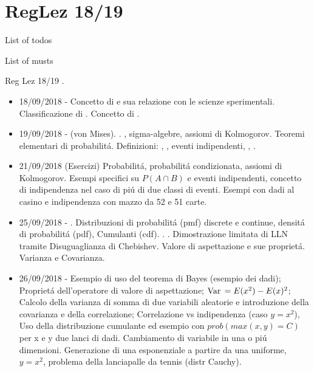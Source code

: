 \section{RegLez 18/19}

\begin{frame}[allowframebreaks]{List of todos}
\listoftodos
\end{frame}

\begin{frame}[allowframebreaks]{List of musts}
\listofmusts
\end{frame}


\begin{frame}[allowframebreaks]{Reg Lez 18/19}
\cite{reg18}.
\begin{itemize}
\item 18/09/2018 - Concetto di  e sua relazione con le scienze sperimentali. Classificazione di . Concetto di .
\item 19/09/2018 -  (von Mises). . , sigma-algebre, assiomi di Kolmogorov. Teoremi elementari di probabilit\'a. Definizioni: , , eventi indipendenti, , .
\item 21/09/2018 (Esercizi) Probabilit\'a, probabilit\'a condizionata, assiomi di Kolmogorov. Esempi specifici su $P(A \cap B)$ e eventi indipendenti, concetto di indipendenza nel caso di pi\'u di due classi di eventi. Esempi con dadi al casino e indipendenza con mazzo da 52 e 51 carte.
\item 25/09/2018 - . Distribuzioni di probabilit\'a (pmf) discrete e continue, densit\'a di probabilit\'a (pdf), Cumulanti (cdf). . . Dimostrazione limitata di LLN tramite Disuguaglianza di Chebishev. Valore di aspettazione e sue propriet\'a. Varianza e Covarianza.
\item 26/09/2018 - Esempio di uso del teorema di Bayes (esempio dei dadi); Propriet\'a dell'operatore di valore di aspettazione; $\operatorname{Var}{}=E(x^2)-E(x)^2$; Calcolo della varianza di somma di due variabili aleatorie e introduzione della covarianza e della correlazione; Correlazione vs indipendenza (caso $y=x^2$), Uso della distribuzione cumulante ed esempio con $prob(max(x,y)=C)$ per x e y due lanci di dadi. Cambiamento di variabile in una o pi\'u dimensioni. Generazione di una esponenziale a partire da una uniforme, $y=x^2$, problema della lanciapalle da tennis (distr Cauchy).

\end{itemize}
\end{frame}

